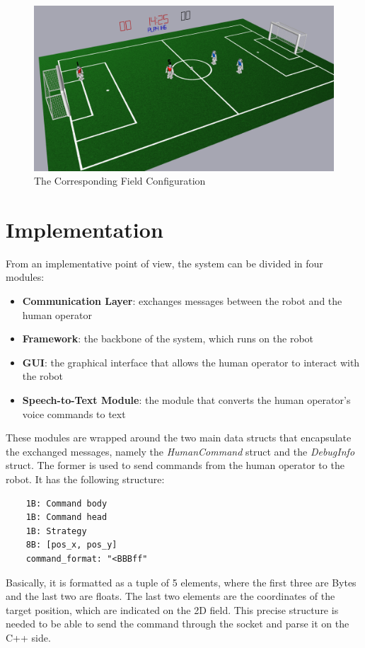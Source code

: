 \documentclass[a4paper, onecolumn, 12pt]{article}
\begin{document}
\begin{figure}[H]
    \centering
    \includegraphics[width=0.9\linewidth]{assets/simrobot.png}
    \caption{The Corresponding Field Configuration}
    \label{fig:nao}
\end{figure}

\newpage
\section{Implementation}
\label{sec:impl}

From an implementative point of view, the system can be divided in four modules: 
\begin{itemize}
    \item \textbf{Communication Layer}: exchanges messages between the robot and the human operator
    \item \textbf{Framework}: the backbone of the system, which runs on the robot
    \item \textbf{GUI}: the graphical interface that allows the human operator to interact with the robot
    \item \textbf{Speech-to-Text Module}: the module that converts the human operator's voice commands to text
\end{itemize}

These modules are wrapped around the two main data structs that encapsulate the
exchanged messages, namely the \textit{HumanCommand} struct and the
\textit{DebugInfo} struct. The former is used to send commands from the human
operator to the robot. It has the following structure:
\begin{verbatim}
    1B: Command body
    1B: Command head
    1B: Strategy
    8B: [pos_x, pos_y]
    command_format: "<BBBff"
\end{verbatim}

Basically, it is formatted as a tuple of 5 elements, where the first three are
Bytes and the last two are floats. The last two elements are the coordinates of
the target position, which are indicated on the 2D field. This precise structure
is needed to be able to send the command through the socket and parse it on the
C++ side.
\end{document}
